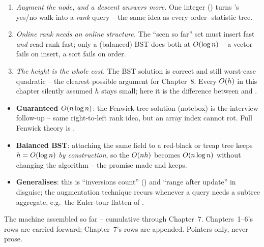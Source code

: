 \begin{insightbox}
\begin{enumerate}[nosep, leftmargin=1.6em]
  \item \emph{Augment the node, and a descent answers more.} One integer () turns
        's yes/no walk into a \emph{rank} query -- the same idea as every order-
        statistic tree.
  \item \emph{Online rank needs an online structure.} The ``seen so far'' set must insert fast
        \emph{and} read rank fast; only a (balanced) BST does both at $O(\log n)$ -- a vector fails
        on insert, a sort fails on order.
  \item \emph{The height is the whole cost.} The BST solution is correct and still worst-case quadratic
        -- the clearest possible argument for Chapter~8. Every $O(h)$ in this chapter silently
        assumed $h$ stays small; here it is the difference between \ac{} and \tle.
\end{enumerate}
\end{insightbox}

\begin{hardeningbox}
\begin{itemize}[nosep, leftmargin=1.4em]
  \item \textbf{Guaranteed $O(n\log n)$}: the Fenwick-tree solution (notebox) is the interview
        follow-up -- same right-to-left rank idea, but an array index cannot rot. Full Fenwick theory
        is .
  \item \textbf{Balanced BST}: attaching the same  field to a red-black or treap tree keeps
        $h=O(\log n)$ \emph{by construction}, so the $O(nh)$ becomes $O(n\log n)$ without
        changing the algorithm -- the promise  made and  keeps.
  \item \textbf{Generalises}: this is ``inversions count'' () and ``range after update'' in
        disguise; the augmentation technique recurs whenever a query needs a subtree aggregate, e.g.\ the
        Euler-tour flatten of .
\end{itemize}
\end{hardeningbox}


The machine assembled so far -- cumulative through Chapter~7. Chapters~1--6's rows are carried
forward; Chapter~7's rows are appended. Pointers only, never prose.

